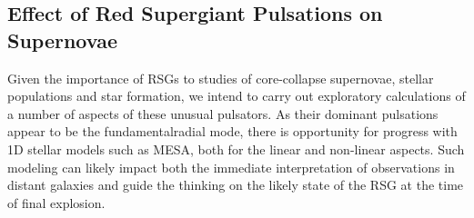 \subsection{Effect of Red Supergiant Pulsations on Supernovae}

Given the importance of RSGs to studies of core-collapse supernovae, stellar populations and star formation, we intend to carry out exploratory calculations of a number of aspects of these unusual pulsators. As their dominant pulsations appear to be the fundamentalradial mode, there is opportunity for progress with 1D stellar models
such as MESA, both for the linear and non-linear aspects. Such
modeling can likely impact both the immediate interpretation of observations in
distant galaxies and guide the thinking on the likely state of the RSG
at the time of final explosion. 